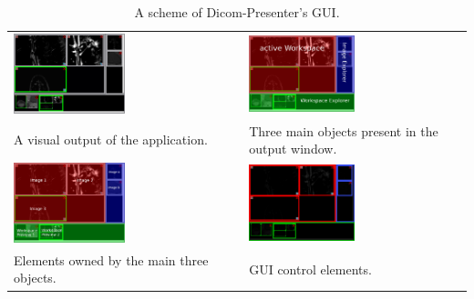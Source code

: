 \begin{table}[ht]
	\captionsetup{tablename=Figures}
	\caption{A scheme of Dicom-Presenter's GUI.}
	\centering
	\begin{tabular}{m{} m{}}
			\includegraphics[width=0.5\textwidth]{Text/IMG/GUI_Screenshot.png}
		&
			\includegraphics[width=0.5\textwidth]{Text/IMG/GUI_Screenshot1_English_Label1.png}
		\\
			A visual output of the application. & Three main objects present in the output window.
		\\
			\includegraphics[width=0.5\textwidth]{Text/IMG/GUI_Screenshot1_English_Label2.png}
		&
			\includegraphics[width=0.5\textwidth]{Text/IMG/GUI_ScreenshotGUI.png}
		\\
			Elements owned by the main three objects.  & GUI control elements.			
		\\
		\end{tabular}
\end{table}%

